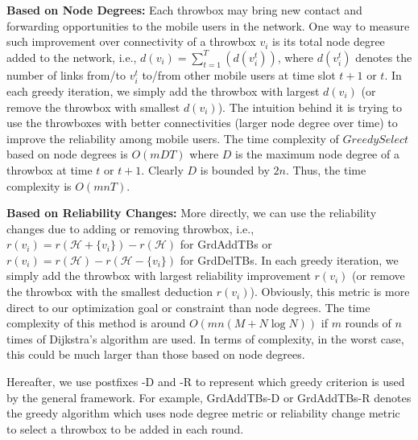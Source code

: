 \documentclass[10pt,conference,compsocconf,letterpaper]{IEEEtran}
\begin{document}
\textbf{Based on Node Degrees:} Each throwbox may bring new contact and forwarding opportunities to the mobile users in the network. One way to measure such improvement over connectivity of a throwbox $v_i$ is its total node degree added to the network, i.e., $d(v_i)=\sum_{t=1}^T(d(v^t_i))$, where $d(v^t_i)$ denotes the number of links from/to $v^t_i$ to/from other mobile users at time slot $t+1$ or $t$.   In each greedy iteration, we simply add the throwbox with largest $d(v_i)$ (or remove the throwbox with smallest $d(v_i)$). The intuition behind it is trying to use the throwboxes with better connectivities (larger node degree over time) to improve the reliability among mobile users. The time complexity of $GreedySelect$ based on node degrees is $O(mDT)$ where $D$ is the maximum node degree of a throwbox at time $t$ or $t+1$. Clearly $D$ is bounded by $2n$. Thus, the time complexity is $O(mnT)$.

\textbf{Based on Reliability Changes:} More directly, we can use the reliability changes due to adding or removing throwbox, i.e., $r(v_i)=r(\mathcal{H}+\{v_i\})-r(\mathcal{H})$ for GrdAddTBs or $r(v_i)=r(\mathcal{H})-r(\mathcal{H}-\{v_i\})$ for GrdDelTBs. In each greedy iteration, we simply add the throwbox with largest reliability improvement $r(v_i)$ (or remove the throwbox with the smallest deduction $r(v_i)$). Obviously, this metric is more direct to our optimization goal or constraint than node degrees. The time complexity of this method is around $O(mn (M+N\log N))$ if  $m$ rounds of $n$ times of Dijkstra's algorithm are used. In terms of complexity, in the worst case, this could be much larger than those based on node degrees.

Hereafter, we use postfixes -D and -R to represent which greedy criterion is used by the general framework. For example, GrdAddTBs-D or GrdAddTBs-R denotes the greedy algorithm which uses node degree metric or reliability change metric to select a throwbox to be added in each round.
\end{document}
